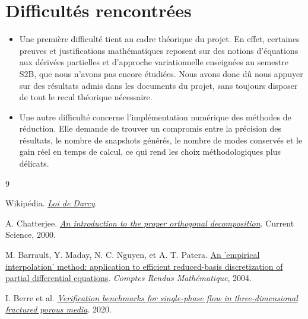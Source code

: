 \documentclass[12pt,a4paper]{article}
\begin{document}
\section{Difficultés rencontrées}

\begin{itemize}
    \item Une première difficulté tient au cadre théorique du projet. En effet, certaines preuves et justifications mathématiques reposent sur des notions d'équations aux dérivées partielles et d'approche variationnelle enseignées au semestre S2B, que nous n'avons pas encore étudiées. Nous avons donc dû nous appuyer sur des résultats admis dans les documents du projet, sans toujours disposer de tout le recul théorique nécessaire.

    \item Une autre difficulté concerne l'implémentation numérique des méthodes de réduction. Elle demande de trouver un compromis entre la précision des résultats, le nombre de snapshots générés, le nombre de modes conservés et le gain réel en temps de calcul, ce qui rend les choix méthodologiques plus délicats.
\end{itemize}

 
\begin{thebibliography}{9}

Wikipédia.
\href{https://fr.wikipedia.org/wiki/Loi_de_Darcy}{\emph{Loi de Darcy}}.

A. Chatterjee.
\href{https://www.researchgate.net/publication/255613988}{\emph{An introduction to the proper orthogonal decomposition}}.
Current Science, 2000.

M. Barrault, Y. Maday, N. C. Nguyen, et A. T. Patera.
\href{https://doi.org/10.1016/j.crma.2004.08.006}{An 'empirical interpolation' method: application to efficient reduced-basis discretization of partial differential equations}.
\emph{Comptes Rendus Mathématique}, 2004.

I. Berre et al.
\href{https://arxiv.org/pdf/2002.07005}{\emph{Verification benchmarks for single-phase flow in three-dimensional fractured porous media}}.
2020.

\end{thebibliography}
\end{document}
